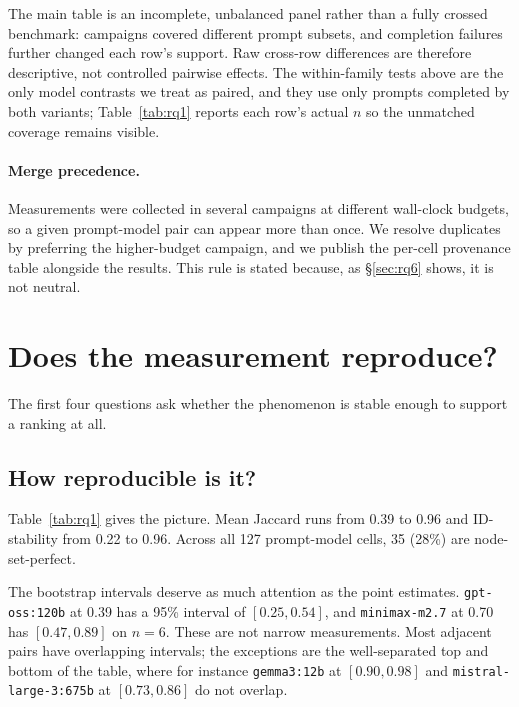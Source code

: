\documentclass{article}
\begin{document}
The main table is an incomplete, unbalanced panel rather than a fully crossed benchmark: campaigns covered different prompt subsets, and completion failures further changed each row's support. Raw cross-row differences are therefore descriptive, not controlled pairwise effects. The within-family tests above are the only model contrasts we treat as paired, and they use only prompts completed by both variants; Table~\ref{tab:rq1} reports each row's actual $n$ so the unmatched coverage remains visible.

\paragraph{Merge precedence.}
Measurements were collected in several campaigns at different wall-clock budgets, so a given prompt-model pair can appear more than once. We resolve duplicates by preferring the higher-budget campaign, and we publish the per-cell provenance table alongside the results. This rule is stated because, as \S\ref{sec:rq6} shows, it is not neutral.

\section{Does the measurement reproduce?}
\label{sec:results}

The first four questions ask whether the phenomenon is stable enough to support a ranking at all.

\subsection{How reproducible is it?}

Table~\ref{tab:rq1} gives the picture. Mean Jaccard runs from 0.39 to 0.96 and ID-stability from 0.22 to 0.96. Across all 127 prompt-model cells, 35 (28\%) are node-set-perfect.

The bootstrap intervals deserve as much attention as the point estimates. \texttt{gpt-oss:120b} at 0.39 has a 95\% interval of $[0.25, 0.54]$, and \texttt{minimax-m2.7} at 0.70 has $[0.47, 0.89]$ on $n=6$. These are not narrow measurements. Most adjacent pairs have overlapping intervals; the exceptions are the well-separated top and bottom of the table, where for instance \texttt{gemma3:12b} at $[0.90,0.98]$ and \texttt{mistral-large-3:675b} at $[0.73,0.86]$ do not overlap.
\end{document}
